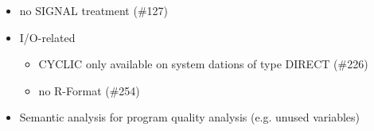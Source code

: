 \documentclass[oneside,10pt]{scrbook}
\begin{document}
\begin{itemize}
\item no SIGNAL treatment (\#127)
\item I/O-related
   \begin{itemize}
   \item CYCLIC only available on system dations of type DIRECT (\#226)
   \item no R-Format (\#254)
   \end{itemize}

\item Semantic analysis for program quality analysis (e.g. unused variables)
\end{itemize}
\end{document}

